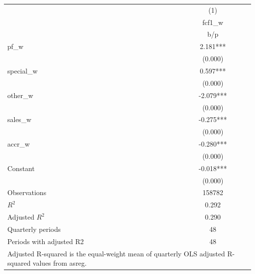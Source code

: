 {
\def\sym#1{\ifmmode^{#1}\else\(^{#1}\)\fi}
\begin{tabular}{l*{1}{c}}
\hline\hline
                    &\multicolumn{1}{c}{(1)}\\
                    &\multicolumn{1}{c}{fcf1\_w}\\
                    &         b/p   \\
\hline
pf\_w                &       2.181***\\
                    &     (0.000)   \\
special\_w           &       0.597***\\
                    &     (0.000)   \\
other\_w             &      -2.079***\\
                    &     (0.000)   \\
sales\_w             &      -0.275***\\
                    &     (0.000)   \\
accr\_w              &      -0.280***\\
                    &     (0.000)   \\
Constant            &      -0.018***\\
                    &     (0.000)   \\
\hline
Observations        &      158782   \\
\(R^{2}\)           &       0.292   \\
Adjusted \(R^{2}\)  &       0.290   \\
Quarterly periods   &          48   \\
Periods with adjusted R2&          48   \\
\hline\hline
\multicolumn{2}{l}{\footnotesize Adjusted R-squared is the equal-weight mean of quarterly OLS adjusted R-squared values from asreg.}\\
\end{tabular}
}
